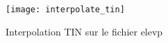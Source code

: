 \begin{figure}[ht]
   \begin{center}
   \texttt{[image: interpolate\_tin]}
   \caption{Interpolation TIN sur le fichier elevp \nixcaption}\label{fig:interpolation_tin}
\end{center}  
\end{figure}
